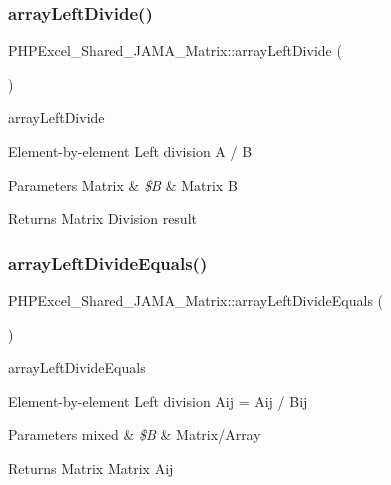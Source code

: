 \subsubsection{\texorpdfstring{array\+Left\+Divide()}{arrayLeftDivide()}}
{\footnotesize\ttfamily P\+H\+P\+Excel\+\_\+\+Shared\+\_\+\+J\+A\+M\+A\+\_\+\+Matrix\+::array\+Left\+Divide (\begin{DoxyParamCaption}{ }\end{DoxyParamCaption})}

array\+Left\+Divide

Element-\/by-\/element Left division A / B 
\begin{DoxyParams}[1]{Parameters}
Matrix & {\em \$B} & Matrix B \\
\hline
\end{DoxyParams}
\begin{DoxyReturn}{Returns}
Matrix Division result 
\end{DoxyReturn}
\mbox{\label{classPHPExcel__Shared__JAMA__Matrix_aa10fd406707e2903d46f28375f4841bd}} 
\subsubsection{\texorpdfstring{array\+Left\+Divide\+Equals()}{arrayLeftDivideEquals()}}
{\footnotesize\ttfamily P\+H\+P\+Excel\+\_\+\+Shared\+\_\+\+J\+A\+M\+A\+\_\+\+Matrix\+::array\+Left\+Divide\+Equals (\begin{DoxyParamCaption}{ }\end{DoxyParamCaption})}

array\+Left\+Divide\+Equals

Element-\/by-\/element Left division Aij = Aij / Bij 
\begin{DoxyParams}[1]{Parameters}
mixed & {\em \$B} & Matrix/\+Array \\
\hline
\end{DoxyParams}
\begin{DoxyReturn}{Returns}
Matrix Matrix Aij 
\end{DoxyReturn}
\mbox{\label{classPHPExcel__Shared__JAMA__Matrix_a5a2decfb42aab022b779737bb240ab58}} 
